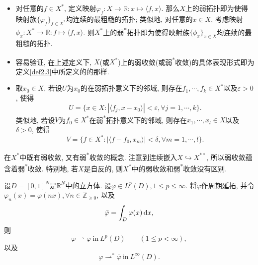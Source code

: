 \begin{itemize}
    \item 对任意的$f \in X^*$, 定义映射$\varphi_f\colon X \rightarrow \mathbb{R}\colon x \mapsto \langle f, x\rangle$.
    那么$X$上的弱拓扑即为使得映射族$\{\varphi_f\}_{f \in X^*}$均连续的最粗糙的拓扑; 类似地, 对任意的$x \in X$, 考虑映射$\phi_x\colon X^* \rightarrow \mathbb{R}\colon f \mapsto \langle f, x\rangle$.
    则$X^*$上的弱\textsuperscript{*}拓扑即为使得映射族$\{\phi_x\}_{x \in X}$均连续的最粗糙的拓扑.
    \item 容易验证, 在上述定义下, $X$(或$X^*$)上的弱收敛(或弱\textsuperscript{*}收敛)的具体表现形式即为定义\ref{def2.3}中所定义的的那样.
    \item 取$x_0 \in X$, 若设$U$为$x_0$的在弱拓扑意义下的邻域, 则存在$f_1, \cdots, f_k \in X^*$以及$\varepsilon > 0$, 使得 
    \begin{equation*}
        U = \{x \in X\colon |\langle f_j, x - x_0\rangle| < \varepsilon, \forall j = 1, \cdots, k\}.
    \end{equation*}
    类似地, 若设$V$为$f_0 \in X^*$在弱\textsuperscript{*}拓扑意义下的邻域, 则存在$x_1, \cdots, x_l \in X$以及$\delta > 0$, 使得 
    \begin{equation*}
        V = \{f \in X^*\colon |\langle f - f_0, x_m\rangle| < \delta, \forall m = 1, \cdots, l\}.
    \end{equation*}
\end{itemize}

\begin{remark}
    在$X^*$中既有弱收敛, 又有弱\textsuperscript{*}收敛的概念. 注意到连续嵌入$X \hookrightarrow  X^{**}$, 所以弱收敛蕴含着弱\textsuperscript{*}收敛.
    特别地, 若$X$是自反的, 则$X^*$中的弱收敛和弱\textsuperscript{*}收敛没有区别.
\end{remark}

\begin{example}\label{ex2.5}
    设$D = [0, 1]^N$是$\mathbb{R}^N$中的立方体. 设$\varphi \in L^p(D), 1 \leq p \leq \infty$.
    将$\varphi$作周期延拓, 并令$\varphi_n(x) = \varphi(nx), \forall n \in \mathbb{Z}_{\geq 0}$, 以及 
    \begin{equation*}
        \bar{\varphi} = \int_D\varphi(x) \,{\rm d}x,
    \end{equation*}
    则
    \begin{equation*}
        \varphi \rightharpoonup \bar{\varphi} \ \text{in}\ L^p(D) \qquad (1 \leq p < \infty),
    \end{equation*}
    以及 
    \begin{equation*}
        \varphi \rightharpoonup^* \bar{\varphi}\ \text{in}\ L^{\infty}(D).
    \end{equation*}
\end{example}

